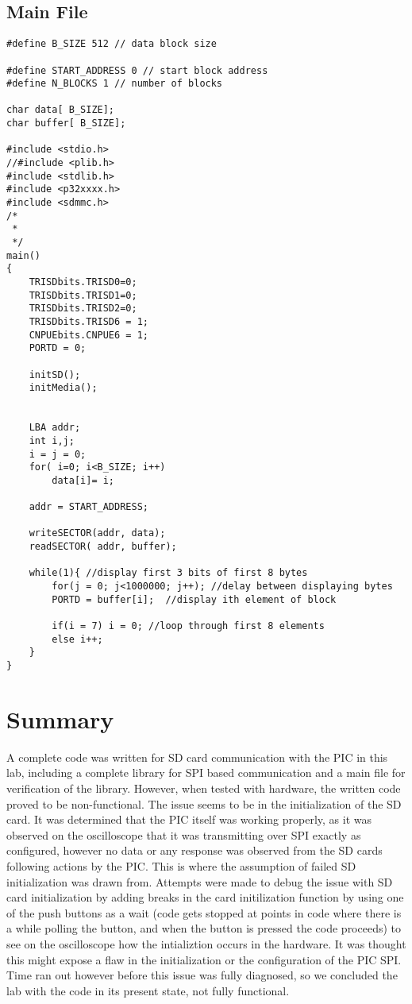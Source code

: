 \documentclass[12pt]{article}
\begin{document}
\subsection*{\normalsize Main File}
\begin{lstlisting}
#define B_SIZE 512 // data block size

#define START_ADDRESS 0 // start block address
#define N_BLOCKS 1 // number of blocks 

char data[ B_SIZE];
char buffer[ B_SIZE]; 

#include <stdio.h>
//#include <plib.h>
#include <stdlib.h>
#include <p32xxxx.h>
#include <sdmmc.h>
/*
 * 
 */
main()
{
    TRISDbits.TRISD0=0; 
    TRISDbits.TRISD1=0;
    TRISDbits.TRISD2=0;
    TRISDbits.TRISD6 = 1;
    CNPUEbits.CNPUE6 = 1;
    PORTD = 0; 

    initSD(); 
    initMedia();


    LBA addr;
    int i,j;
    i = j = 0;
    for( i=0; i<B_SIZE; i++)
        data[i]= i; 
    
    addr = START_ADDRESS;
    
    writeSECTOR(addr, data);
    readSECTOR( addr, buffer);

    while(1){ //display first 3 bits of first 8 bytes
        for(j = 0; j<1000000; j++); //delay between displaying bytes
        PORTD = buffer[i];  //display ith element of block
        
        if(i = 7) i = 0; //loop through first 8 elements
        else i++;
    }
}
\end{lstlisting}

\section{Summary}
A complete code was written for SD card communication with the PIC in this lab, including a complete library for SPI based communication and a main file for verification of the library. However, when tested with hardware, the written code proved to be non-functional. The issue seems to be in the initialization of the SD card. It was determined that the PIC itself was working properly, as it was observed on the oscilloscope that it was transmitting over SPI exactly as configured, however no data or any response was observed from the SD cards following actions by the PIC. This is where the assumption of failed SD initialization was drawn from. Attempts were made to debug the issue with SD card initialization by adding breaks in the card initilization function by using one of the push buttons as a wait (code gets stopped at points in code where there is a while polling the button, and when the button is pressed the code proceeds) to see on the oscilloscope how the intializtion occurs in the hardware. It was thought this might expose a flaw in the initialization or the configuration of the PIC SPI. Time ran out however before this issue was fully diagnosed, so we concluded the lab with the code in its present state, not fully functional.
\end{document}
